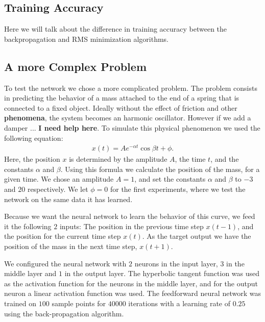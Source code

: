 \documentclass[11pt]{article}
\begin{document}
\subsection{Training Accuracy} %
\label{sub:training_accuracy}

Here we will talk about the difference in training accuracy between the backpropagation and RMS minimization algorithms.


\subsection{A more Complex Problem} %
\label{sub:a_more_complex_problem}

To test the network we chose a more complicated problem. The problem consists in predicting the behavior of a mass attached to the end
of a spring that is connected to a fixed object. Ideally without the effect of friction and other \textbf{phenomena}, the system becomes
an harmonic oscillator. However if we add a damper ... \textbf{I need help here}. To simulate this physical phenomenon we used the
following equation:
\begin{eqnarray}\label{eqn:damping}
	x(t) = Ae^{-\alpha t}\cos{\beta t+\phi}.
\end{eqnarray}
Here, the position $x$ is determined by the amplitude $A$, the time $t$, and the constants $\alpha$ and $\beta$. Using this formula we
calculate the position of the mass, for a given time. We chose an amplitude $A=1$, and set the constants $\alpha$ and $\beta$ to $-3$
and $20$ respectively. We let $\phi=0$ for the first experiments, where we test the network on the same data it has learned.

Because we want the neural network to learn the behavior of this curve, we feed it the following $2$ inputs: The position in the
previous time step $x(t-1)$, and the position for the current time step $x(t)$. As the target output we have the position of the mass in
the next time step, $x(t+1)$.

We configured the neural network with $2$ neurons in the input layer, $3$ in the middle layer and $1$ in the output layer. The
hyperbolic tangent function was used as the activation function for the neurons in the middle layer, and for the output neuron a linear
activation function was used. The feedforward neural network was trained on $100$ sample points for $40000$ iterations with a learning
rate of $0.25$ using the back-propagation algorithm.
\end{document}
